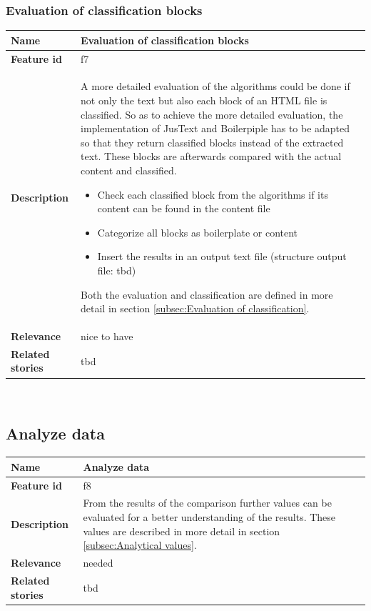 \subsubsection{Evaluation of classification blocks}
\label{subsec:Evaluation of classification blocks}

	\begin{tabular}{ | p{3cm} | p{12cm} |}
	\hline
	\textbf{Name} 				& Evaluation of classification blocks \\ \hline
	\textbf{Feature id} 		& f7 \\ \hline
	\textbf{Description} 		& A more detailed evaluation of the algorithms could be done if not only the text but also each block of an HTML file is classified. So as to achieve the more detailed evaluation, the implementation of JusText and Boilerpiple has to be adapted so that they return classified blocks instead of the extracted text. These blocks are afterwards compared with the actual content and classified. 
								\begin{itemize}
							        \item Check each classified block from the algorithms if its content can be found in the content file
							        \item Categorize all blocks as boilerplate or content
							        \item Insert the results in an output text file (structure output file: tbd)
						        \end{itemize} 
	Both the evaluation and classification are defined in more detail in section \ref{subsec:Evaluation of classification}.
	\\ \hline
	\textbf{Relevance} 			& nice to have\\ \hline
	\textbf{Related stories} 	& tbd \\ \hline
	\end{tabular} \\





\subsection{Analyze data}
\label{subsec:Analyze data}

	\begin{tabular}{ | p{3cm} | p{12cm} |}
	\hline
	\textbf{Name} 				& Analyze data \\ \hline
	\textbf{Feature id} 		& f8 \\ \hline
	\textbf{Description} 		&  From the results of the comparison further values can be evaluated for a better understanding of the results. These values are described in more detail in section \ref{subsec:Analytical values}.
								    \\ \hline
	\textbf{Relevance} 			& needed \\ \hline
	\textbf{Related stories} 	& tbd \\ \hline
	\end{tabular} \\


